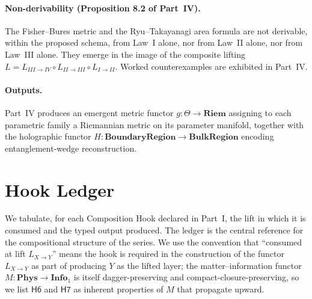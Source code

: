 \documentclass[12pt]{article}
\theoremstyle{definition}
\theoremstyle{remark}
\newcommand{\Phys}{\mathbf{Phys}}
\newcommand{\Info}{\mathbf{Info}}
\begin{document}
\paragraph{Non-derivability (Proposition 8.2 of Part~IV).} The Fisher--Bures
metric and the Ryu--Takayanagi area formula are not derivable, within the
proposed schema, from Law~I alone, nor from Law~II alone, nor from Law~III
alone. They emerge in the image of the composite lifting $L = L_{III\to IV}
\circ L_{II\to III} \circ L_{I \to II}$. Worked counterexamples are exhibited
in Part~IV.

\paragraph{Outputs.} Part~IV produces an emergent metric functor
$g : \Theta \to \mathbf{Riem}$ assigning to each parametric family a
Riemannian metric on its parameter manifold, together with the holographic
functor $H : \mathbf{BoundaryRegion} \to \mathbf{BulkRegion}$ encoding
entanglement-wedge reconstruction.

\section{Hook Ledger}
\label{sec:hook-ledger}

We tabulate, for each Composition Hook declared in Part~I, the lift in which
it is consumed and the typed output produced. The ledger is the central
reference for the compositional structure of the series. We use the
convention that ``consumed at lift $L_{X\to Y}$'' means the hook is required
in the construction of the functor $L_{X\to Y}$ as part of producing $Y$ as
the lifted layer; the matter--information functor $M : \Phys \to \Info_1$ is
itself dagger-preserving and compact-closure-preserving, so we list
$\mathsf{H6}$ and $\mathsf{H7}$ as inherent properties of $M$ that propagate
upward.
\end{document}
